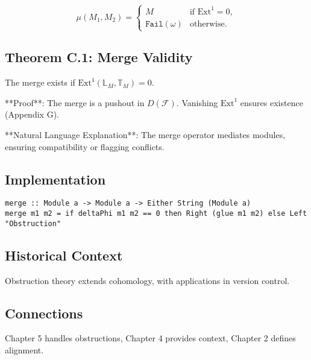 \documentclass[12pt]{article}
\begin{document}
\[
\mu(M_1, M_2) = \begin{cases} 
M & \text{if } \mathrm{Ext}^1 = 0, \\
\texttt{Fail}(\omega) & \text{otherwise}.
\end{cases}
\]

\subsection{Theorem C.1: Merge Validity}
The merge exists if $\mathrm{Ext}^1(\mathbb{L}_M, \mathbb{T}_M) = 0$.

**Proof**: The merge is a pushout in $D(\mathcal{F})$. Vanishing $\mathrm{Ext}^1$ ensures existence \cite{illusie1971complexe} (Appendix G).

**Natural Language Explanation**: The merge operator mediates modules, ensuring compatibility or flagging conflicts.

\subsection{Implementation}
\begin{lstlisting}
merge :: Module a -> Module a -> Either String (Module a)
merge m1 m2 = if deltaPhi m1 m2 == 0 then Right (glue m1 m2) else Left "Obstruction"
\end{lstlisting}

\subsection{Historical Context}
Obstruction theory extends cohomology, with applications in version control.

\subsection{Connections}
Chapter 5 handles obstructions, Chapter 4 provides context, Chapter 2 defines alignment.

\begin{center}
\end{center}
\end{document}
